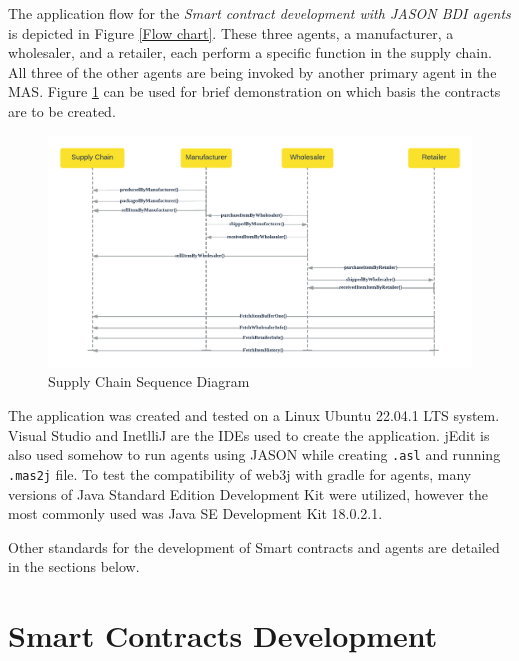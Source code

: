 \vspace{.5cm}

The application flow for the \textit{Smart contract development with JASON \ac{BDI} agents} is depicted in Figure  \ref{Flow chart}. These three agents, a manufacturer, a wholesaler, and a retailer, each perform a specific function in the supply chain. All three of the other agents are being invoked by another primary agent in the \ac{MAS}. Figure \ref{Sequence Diagram} can be used for brief demonstration on which basis the contracts are to be created.

\vspace{.5cm}

   \begin{figure}[h]
    \centering
      \includegraphics[width=\linewidth]{includes/figures/Sequence diagram.png} 
      \caption{Supply Chain Sequence Diagram}
      \label{Sequence Diagram}
    \end{figure}

\vspace{.5cm}

The application was created and tested on a Linux Ubuntu 22.04.1 LTS system.
Visual Studio and InetlliJ are the \ac{IDE}s used to create the application. jEdit is also used somehow to run agents using JASON while creating \texttt{.asl} and running \texttt{.mas2j} file.
To test the compatibility of web3j with gradle for agents, many versions of Java Standard Edition Development Kit were utilized, however the most commonly used was Java SE Development Kit 18.0.2.1. 

\vspace{.5cm}

Other standards for the development of Smart contracts and agents are detailed in the sections below.

\section{Smart Contracts Development }   

